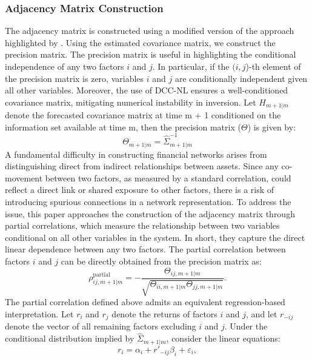 \documentclass[11pt]{article}
\begin{document}
\subsubsection{Adjacency Matrix Construction}
The adjacency matrix is constructed using a modified version of the approach highlighted by \cite{peralta2016network}. Using the estimated covariance matrix, we construct the precision matrix. The precision matrix is useful in highlighting the conditional independence of any two factors $i$ and $j$. In particular, if the $(i,j$)-th element of the precision matrix is zero, variables $i$ and $j$ are conditionally independent given all other variables. Moreover, the use of DCC-NL ensures a well-conditioned covariance matrix, mitigating numerical instability in inversion. Let $H_{m+1|m}$ denote the forecasted covariance matrix at time m + 1 conditioned on the information set available at time m, then the precision matrix ($\Theta$) is given by: 
\begin{equation}
\Theta_{m+1|m} = \widehat\Sigma_{m+1|m}^{-1}
\end{equation}
A fundamental difficulty in constructing financial networks arises from distinguishing direct from indirect relationships between assets. Since any co-movement between two factors, as measured by a standard correlation, could reflect a direct link or shared exposure to other factors, there is a risk of introducing spurious connections in a network representation. To address the issue, this paper approaches the construction of the adjacency matrix through partial correlations, which measure the relationship between two variables conditional on all other variables in the system. In short, they capture the direct linear dependence between any two factors. The partial correlation between factors $i$ and $j$ can be directly obtained from the precision matrix as:
\begin{equation}
\rho^{\text{partial}}_{ij,m+1|m}
=
-\frac{\Theta_{ij,m+1|m}}{\sqrt{\Theta_{ii,m+1|m}\Theta_{jj,m+1|m}}}.
\end{equation} 
The partial correlation defined above admits an equivalent regression-based interpretation. Let $r_i$ and $r_j$ denote the returns of factors $i$ and $j$, and let $r_{-ij}$ denote the vector of all remaining factors excluding $i$ and $j$. Under the conditional distribution implied by $\widehat{\Sigma}_{m+1|m}$, consider the linear equations:
\begin{equation}
r_i = \alpha_i + r'_{-ij} \beta_i + \varepsilon_i,
\end{equation}
\end{document}
